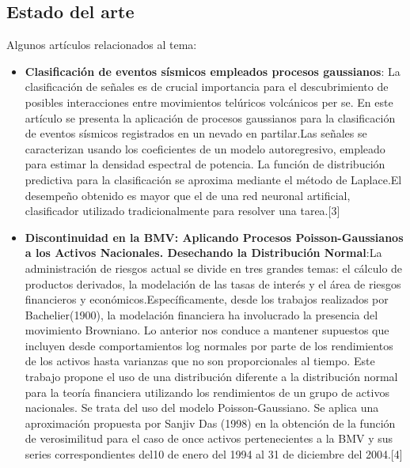 \documentclass[12pt,a4paper]{article}
\begin{document}
\begin{multicols}{2}
\section{Estado del arte}
    Algunos artículos relacionados al tema:
    \begin{itemize}
        \item \textbf{Clasificación de eventos sísmicos empleados  procesos gaussianos}: La clasificación de señales es de crucial  importancia para el descubrimiento de posibles interacciones entre movimientos telúricos volcánicos per se. En este artículo  se presenta la aplicación de procesos gaussianos para la clasificación de eventos sísmicos registrados en un nevado en partilar.Las señales se caracterizan usando los coeficientes  de un modelo autoregresivo, empleado para estimar la densidad espectral de potencia. La función de distribución predictiva para la clasificación se aproxima mediante el método de Laplace.El desempeño obtenido es mayor que el de una red neuronal artificial, clasificador  utilizado tradicionalmente para resolver una tarea.[3]\\
        \item \textbf{Discontinuidad en la BMV: Aplicando Procesos Poisson-Gaussianos a los Activos Nacionales. Desechando la Distribución Normal}:La administración de riesgos actual se divide en tres grandes temas: el cálculo de productos derivados, la modelación de las tasas de interés y el área de riesgos financieros y económicos.Específicamente, desde los trabajos realizados por Bachelier(1900), la modelación financiera ha involucrado la presencia del movimiento Browniano. Lo anterior nos conduce a mantener supuestos que incluyen desde comportamientos log normales por parte de los rendimientos de los activos hasta varianzas que no son proporcionales al tiempo. Este trabajo propone el uso de una distribución diferente a la distribución normal para la teoría financiera utilizando los rendimientos de un grupo de activos nacionales. Se trata del uso del modelo Poisson-Gaussiano. Se aplica una aproximación propuesta por Sanjiv Das (1998) en la obtención de la función de verosimilitud para el caso de once activos pertenecientes a la BMV y sus series correspondientes del10 de enero del 1994 al 31 de diciembre del 2004.[4]\\

\end{itemize}
\end{multicols}
\end{document}
